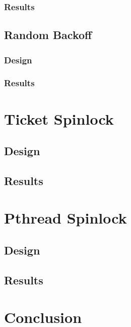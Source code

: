 \documentclass[11pt,fancy,authoryear]{elegantbook}
\begin{document}
\subsection{Results}

\section{Random Backoff}

\subsection{Design}

\subsection{Results}

\chapter{Ticket Spinlock}

\section{Design}

\section{Results}

\chapter{Pthread Spinlock}

\section{Design}

\section{Results}

\chapter{Conclusion}
\end{document}
